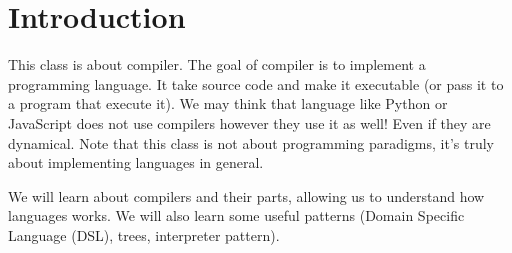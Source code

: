 \chapter{Introduction}
\label{chap:introduction}
This class is about compiler. The goal of compiler is to implement a programming
language. It take source code and make it executable (or pass it to a program
that execute it). We may think that language like Python or JavaScript does not
use compilers however they use it as well! Even if they are dynamical. Note that
this class is not about programming paradigms, it's truly about implementing
languages in general.

We will learn about compilers and their parts, allowing us to understand how
languages works. We will also learn some useful patterns (Domain Specific
Language (DSL), trees, interpreter pattern).